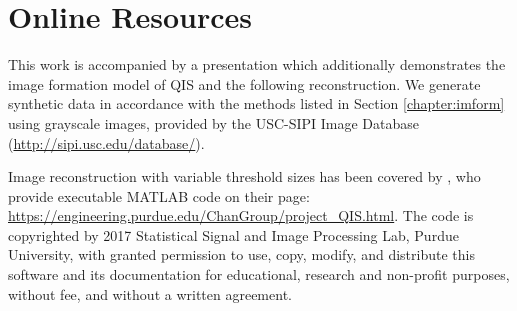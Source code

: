 \documentclass[sigplan,screen]{acmart}
\begin{document}



\appendix

\section{Online Resources}

This work is accompanied by a presentation which additionally demonstrates the image formation model of QIS and the following reconstruction. We generate synthetic data in accordance with the methods listed in Section \ref{chapter:imform} using grayscale images, provided by the USC-SIPI Image Database (\url{http://sipi.usc.edu/database/}).

Image reconstruction with variable threshold sizes has been covered by \cite{qisthreshold}, who provide executable MATLAB code on their page: \url{https://engineering.purdue.edu/ChanGroup/project_QIS.html}. The code is copyrighted by 2017 Statistical Signal and Image Processing Lab, Purdue University, with granted permission to use, copy, modify, and distribute this software and its documentation for educational, research and non-profit purposes, without fee, and without a written agreement.
\end{document}
